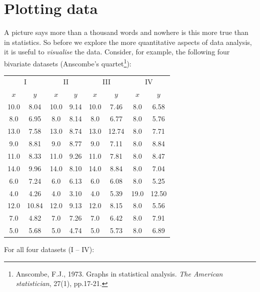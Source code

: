 \chapter{Plotting data}
\label{ch:plotting}

A picture says more than a thousand words and nowhere is this more
true than in statistics. So before we explore the more quantitative
aspects of data analysis, it is useful to \emph{visualise} the data.
Consider, for example, the following four bivariate datasets
(Anscombe's quartet\footnote{Anscombe, F.J., 1973. Graphs in
  statistical analysis. \emph{The American statistician}, 27(1),
  pp.17-21.}):\medskip

\noindent\begin{minipage}[t][][b]{.6\textwidth}
  \begin{tabular}{cc|cc|cc|cc}
    \multicolumn{2}{c}{I} & \multicolumn{2}{c}{II} &
    \multicolumn{2}{c}{III} & \multicolumn{2}{c}{IV} \\
    $x$ & $y$ & $x$ & $y$ & $x$ & $y$ & $x$ & $y$ \\ \hline
    10.0 & 8.04 & 10.0 & 9.14 & 10.0 & 7.46 & 8.0 & 6.58 \\
    8.0 & 6.95 & 8.0 & 8.14 & 8.0 & 6.77 & 8.0 & 5.76 \\
    13.0 & 7.58 & 13.0 & 8.74 & 13.0 & 12.74 & 8.0 & 7.71 \\
    9.0 & 8.81 & 9.0 & 8.77 & 9.0 & 7.11 & 8.0 & 8.84 \\
    11.0 & 8.33 & 11.0 & 9.26 & 11.0 & 7.81 & 8.0 & 8.47 \\
    14.0 & 9.96 & 14.0 & 8.10 & 14.0 & 8.84 & 8.0 & 7.04 \\
    6.0 & 7.24 & 6.0 & 6.13 & 6.0 & 6.08 & 8.0 & 5.25 \\
    4.0 & 4.26 & 4.0 & 3.10 & 4.0 & 5.39 & 19.0 & 12.50 \\
    12.0 & 10.84 & 12.0 & 9.13 & 12.0 & 8.15 & 8.0 & 5.56 \\
    7.0 & 4.82 & 7.0 & 7.26 & 7.0 & 6.42 & 8.0 & 7.91 \\
    5.0 & 5.68 & 5.0 & 4.74 & 5.0 & 5.73 & 8.0 & 6.89 \\
  \end{tabular}
\end{minipage}
\begin{minipage}[t][][t]{.4\textwidth}
  \label{tab:anscombe}
\end{minipage}\medskip

For all four datasets (I -- IV):

